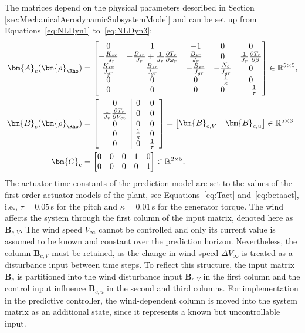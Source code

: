 The matrices depend on the physical parameters described in Section \ref{sec:MechanicalAerodynamicSubsystemModel} and can be set up from Equations~\eqref{eq:NLDyn1} to~\eqref{eq:NLDyn3}:  
\begin{equation}
    \begin{aligned}
        \bm{A}_c(\bm{\rho}_{\Rho}) &=
        \begin{bmatrix}
            0  & 1 & -1 & 0 & 0 \\ 
            -\frac{K_{sr}}{J_r}  & -\frac{B_{sr}}{J_r} + \frac{1}{J_r}\frac{\partial T_r}{\partial{\omega_r}} & \frac{B_{sr}}{J_r} & 0 & \frac{1}{J_r}\frac{\partial T_r}{\partial{\beta}} \\ 
            \frac{K_{sr}}{J_{gr}} & \frac{B_{sr}}{J_{gr}} & -\frac{B_{sr}}{J_{gr}} & -\frac{N_g}{J_{gr}} & 0 \\ 
            0 & 0 & 0 & -\frac{1}{\kappa} & 0 \\ 
            0 & 0 & 0 & 0 & -\frac{1}{\tau} 
        \end{bmatrix} \in \mathbb{R}^{5 \times 5},\\
\bm{B}_c(\bm{\rho}_{\Rho}) &=
\left[
\begin{array}{c|cc}
    0 & 0 & 0 \\
    \frac{1}{J_r}\frac{\partial T_r}{\partial V_{\infty}} & 0 & 0 \\
    0 & 0 & 0 \\
    0 & \frac{1}{\kappa} & 0 \\
    0 & 0 & \frac{1}{\tau}
\end{array}
\right]
=
\begin{bmatrix}
    \bm{B}_{c,V} & \bm{B}_{c,u}
\end{bmatrix}
\in \mathbb{R}^{5 \times 3}\\
        \bm{C}_c &=
        \begin{bmatrix}
            0 & 0 & 0 & 1 & 0 \\
            0 & 0 & 0 & 0 & 1
        \end{bmatrix} \in \mathbb{R}^{2 \times 5}.
    \end{aligned}
\end{equation}
%
The actuator time constants of the prediction model are set to the values of the first-order actuator models of the plant, see Equations~\eqref{eq:Tact} and~\eqref{eq:betaact}, i.e., $\tau = 0.05$\,s for the pitch and $\kappa = 0.01$\,s for the generator torque.
The wind affects the system through the first column of the input matrix, denoted here as $\bm{B}_{c,V}$. The wind speed $V_{\infty}$ cannot be controlled and only its current value is assumed to be known and constant over the prediction horizon. Nevertheless, the column $\bm{B}_{c,V}$ must be retained, as the change in wind speed $\Delta V_{\infty}$ is treated as a disturbance input between time steps. To reflect this structure, the input matrix $\bm{B}_c$ is partitioned into the wind disturbance input $\bm{B}_{c,V}$ in the first column and the control input influence $\bm{B}_{c,u}$ in the second and third columns. For implementation in the predictive controller, the wind-dependent column is moved into the system matrix as an additional state, since it represents a known but uncontrollable input.

